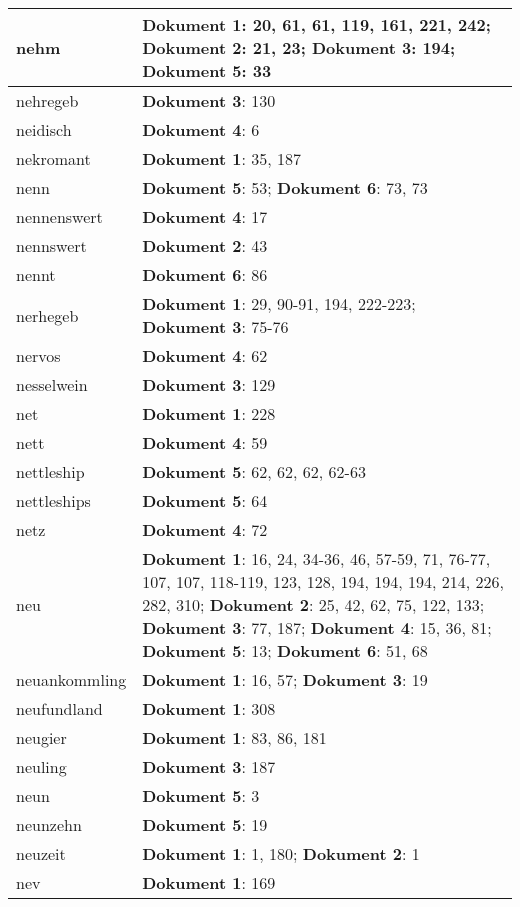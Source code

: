 \documentclass[a5paper]{article}
\begin{document}
\begin{longtable}[l]{|l|p{3in}|}
\hline
nehm & \textbf{Dokument 1}: 20, 61, 61, 119, 161, 221, 242; \textbf{Dokument 2}: 21, 23; \textbf{Dokument 3}: 194; \textbf{Dokument 5}: 33 \\
\hline
nehregeb & \textbf{Dokument 3}: 130 \\
\hline
neidisch & \textbf{Dokument 4}: 6 \\
\hline
nekromant & \textbf{Dokument 1}: 35, 187 \\
\hline
nenn & \textbf{Dokument 5}: 53; \textbf{Dokument 6}: 73, 73 \\
\hline
nennenswert & \textbf{Dokument 4}: 17 \\
\hline
nennswert & \textbf{Dokument 2}: 43 \\
\hline
nennt & \textbf{Dokument 6}: 86 \\
\hline
nerhegeb & \textbf{Dokument 1}: 29, 90-91, 194, 222-223; \textbf{Dokument 3}: 75-76 \\
\hline
nervos & \textbf{Dokument 4}: 62 \\
\hline
nesselwein & \textbf{Dokument 3}: 129 \\
\hline
net & \textbf{Dokument 1}: 228 \\
\hline
nett & \textbf{Dokument 4}: 59 \\
\hline
nettleship & \textbf{Dokument 5}: 62, 62, 62, 62-63 \\
\hline
nettleships & \textbf{Dokument 5}: 64 \\
\hline
netz & \textbf{Dokument 4}: 72 \\
\hline
neu & \textbf{Dokument 1}: 16, 24, 34-36, 46, 57-59, 71, 76-77, 107, 107, 118-119, 123, 128, 194, 194, 194, 214, 226, 282, 310; \textbf{Dokument 2}: 25, 42, 62, 75, 122, 133; \textbf{Dokument 3}: 77, 187; \textbf{Dokument 4}: 15, 36, 81; \textbf{Dokument 5}: 13; \textbf{Dokument 6}: 51, 68 \\
\hline
neuankommling & \textbf{Dokument 1}: 16, 57; \textbf{Dokument 3}: 19 \\
\hline
neufundland & \textbf{Dokument 1}: 308 \\
\hline
neugier & \textbf{Dokument 1}: 83, 86, 181 \\
\hline
neuling & \textbf{Dokument 3}: 187 \\
\hline
neun & \textbf{Dokument 5}: 3 \\
\hline
neunzehn & \textbf{Dokument 5}: 19 \\
\hline
neuzeit & \textbf{Dokument 1}: 1, 180; \textbf{Dokument 2}: 1 \\
\hline
nev & \textbf{Dokument 1}: 169 \\

\end{longtable}
\end{document}
